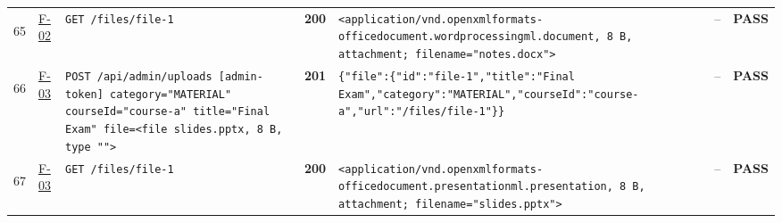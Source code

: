\documentclass[10pt,a4paper]{article}
\begin{document}
\begin{landscape}
\begin{longtable}{@{}P{0.6cm}P{0.9cm}P{8.5cm}P{1.0cm}P{6.2cm}P{4.2cm}P{1.1cm}@{}}
\hypertarget{call65}{65} & \hyperlink{test-F-02}{F-02} & \texttt{GET /\allowbreak{}files/\allowbreak{}file-\allowbreak{}1} & \textcolor{passgreen}{\textbf{200}} & \texttt{<application/\allowbreak{}vnd.\allowbreak{}openxmlformats-\allowbreak{}officedocument.\allowbreak{}wordprocessingml.\allowbreak{}document,\allowbreak{} 8 B,\allowbreak{} attachment; filename=\allowbreak{}"\allowbreak{}notes.\allowbreak{}docx"\allowbreak{}>} & -- & \textcolor{passgreen}{\textbf{PASS}} \\
\hypertarget{call66}{66} & \hyperlink{test-F-03}{F-03} & \texttt{POST /\allowbreak{}api/\allowbreak{}admin/\allowbreak{}uploads [admin-\allowbreak{}token] category=\allowbreak{}"\allowbreak{}MATERIAL"\allowbreak{} courseId=\allowbreak{}"\allowbreak{}course-\allowbreak{}a"\allowbreak{} title=\allowbreak{}"\allowbreak{}Final Exam"\allowbreak{} file=\allowbreak{}<file slides.\allowbreak{}pptx,\allowbreak{} 8 B,\allowbreak{} type "\allowbreak{}"\allowbreak{}>} & \textcolor{passgreen}{\textbf{201}} & \texttt{\{"\allowbreak{}file"\allowbreak{}:\allowbreak{}\{"\allowbreak{}id"\allowbreak{}:\allowbreak{}"\allowbreak{}file-\allowbreak{}1"\allowbreak{},\allowbreak{}"\allowbreak{}title"\allowbreak{}:\allowbreak{}"\allowbreak{}Final Exam"\allowbreak{},\allowbreak{}"\allowbreak{}category"\allowbreak{}:\allowbreak{}"\allowbreak{}MATERIAL"\allowbreak{},\allowbreak{}"\allowbreak{}courseId"\allowbreak{}:\allowbreak{}"\allowbreak{}course-\allowbreak{}a"\allowbreak{},\allowbreak{}"\allowbreak{}url"\allowbreak{}:\allowbreak{}"\allowbreak{}/\allowbreak{}files/\allowbreak{}file-\allowbreak{}1"\allowbreak{}\}\}} & -- & \textcolor{passgreen}{\textbf{PASS}} \\
\hypertarget{call67}{67} & \hyperlink{test-F-03}{F-03} & \texttt{GET /\allowbreak{}files/\allowbreak{}file-\allowbreak{}1} & \textcolor{passgreen}{\textbf{200}} & \texttt{<application/\allowbreak{}vnd.\allowbreak{}openxmlformats-\allowbreak{}officedocument.\allowbreak{}presentationml.\allowbreak{}presentation,\allowbreak{} 8 B,\allowbreak{} attachment; filename=\allowbreak{}"\allowbreak{}slides.\allowbreak{}pptx"\allowbreak{}>} & -- & \textcolor{passgreen}{\textbf{PASS}} \\

\end{longtable}
\end{landscape}
\end{document}
